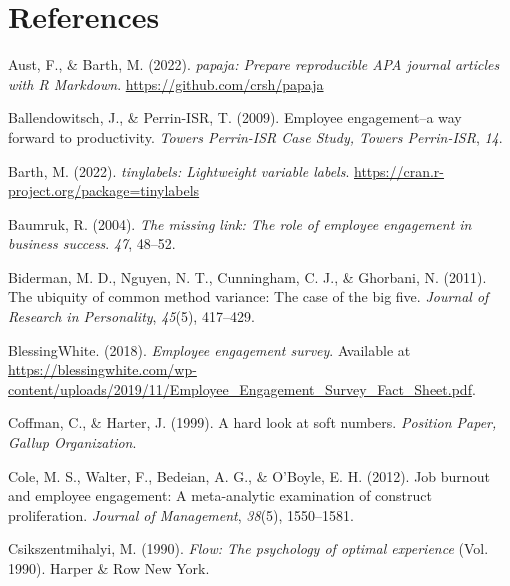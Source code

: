 \documentclass[
  man]{apa6}
\newlength{\cslhangindent}
\newlength{\cslentryspacingunit} %
\newenvironment{CSLReferences}[2] %
 {%
  \setlength{\parindent}{0pt}
  \ifodd #1
  \let\oldpar\par
  \def\par{\hangindent=\cslhangindent\oldpar}
  \fi
  \setlength{\parskip}{#2\cslentryspacingunit}
 }%
 {}
\begin{document}
\newpage

\hypertarget{references}{%
\section{References}\label{references}}

\hypertarget{refs}{}
\begin{CSLReferences}{1}{0}
\leavevmode{}%
Aust, F., \& Barth, M. (2022). \emph{{papaja}: {Prepare} reproducible {APA} journal articles with {R Markdown}}. \url{https://github.com/crsh/papaja}

\leavevmode{}%
Ballendowitsch, J., \& Perrin-ISR, T. (2009). Employee engagement--a way forward to productivity. \emph{Towers Perrin-ISR Case Study, Towers Perrin-ISR}, \emph{14}.

\leavevmode{}%
Barth, M. (2022). \emph{{tinylabels}: Lightweight variable labels}. \url{https://cran.r-project.org/package=tinylabels}

\leavevmode{}%
Baumruk, R. (2004). \emph{The missing link: The role of employee engagement in business success}. \emph{47}, 48--52.

\leavevmode{}%
Biderman, M. D., Nguyen, N. T., Cunningham, C. J., \& Ghorbani, N. (2011). The ubiquity of common method variance: The case of the big five. \emph{Journal of Research in Personality}, \emph{45}(5), 417--429.

\leavevmode{}%
BlessingWhite. (2018). \emph{Employee engagement survey}. Available at \url{https://blessingwhite.com/wp-content/uploads/2019/11/Employee_Engagement_Survey_Fact_Sheet.pdf}.

\leavevmode{}%
Coffman, C., \& Harter, J. (1999). A hard look at soft numbers. \emph{Position Paper, Gallup Organization}.

\leavevmode{}%
Cole, M. S., Walter, F., Bedeian, A. G., \& O'Boyle, E. H. (2012). Job burnout and employee engagement: A meta-analytic examination of construct proliferation. \emph{Journal of Management}, \emph{38}(5), 1550--1581.

\leavevmode{}%
Csikszentmihalyi, M. (1990). \emph{Flow: The psychology of optimal experience} (Vol. 1990). Harper \& Row New York.


\end{CSLReferences}
\end{document}
